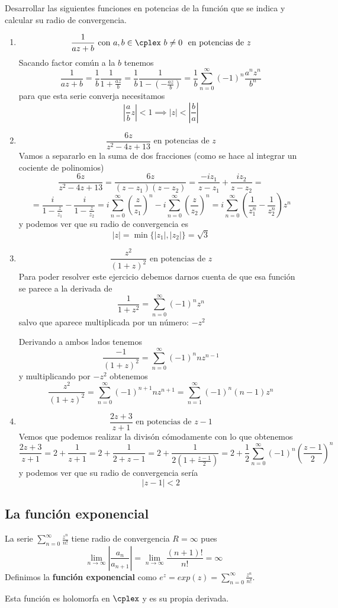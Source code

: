 \documentclass{apuntes}
\begin{document}
\begin{example}
Desarrollar las siguientes funciones en potencias de la función que se indica y calcular su radio de convergencia.
\begin{enumerate}
\item
\[\frac{1}{az+b} \text{ con } a,b \in \cplex \ b \neq 0 \ \text{ en potencias de } z\]
Sacando factor común a la $b$ tenemos
\[\frac{1}{az+b} =  \frac{1}{b} \frac{1}{1+\frac{az}{b}} = \frac{1}{b}\frac{1}{1-\left(-\frac{az}{b}\right)} = \frac{1}{b}\sum_{n=0}^{\infty}(-1)^n\frac{a^nz^n}{b^n}\]
para que esta serie converja necesitamos
\[\left| \frac{a}{b}z\right| < 1 \implies |z| < \left| \frac{b}{a} \right|\]

\item
\[\frac{6z}{z^2-4z+13} \text{ en potencias de } z\]
Vamos a separarlo en la suma de dos fracciones (como se hace al integrar un cociente de polinomios)
\[\frac{6z}{z^2-4z+13} = \frac{6z}{(z-z_1)(z-z_2)} = \frac{-iz_1}{z-z_1} + \frac{iz_2}{z-z_2} = \]
\[= \frac{i}{1-\frac{z}{z_1}} - \frac{i}{1-\frac{z}{z_2}} = i\sum_{n=0}^{\infty}\left(\frac{z}{z_1}\right)^n - i\sum_{n=0}^{\infty}\left(\frac{z}{z_2}\right)^n = i\sum_{n=0}^{\infty}\left( \frac{1}{z_1^n}-\frac{1}{z_2^n}\right)z^n\]
y podemos ver que su radio de convergencia es
\[|z| = \min \{|z_1|, |z_2|\}= \sqrt{3}\]

\item
\[\frac{z^2}{(1+z)^2} \text{ en potencias de } z\]
Para poder resolver este ejercicio debemos darnos cuenta de que esa función se parece a la derivada de
\[\frac{1}{1+z^2} = \sum_{n=0}^{\infty}(-1)^n z^n\]
salvo que aparece multiplicada por un número: $-z^2$

Derivando a ambos lados tenemos
\[\frac{-1}{(1+z)^2}=\sum_{n=0}^{\infty}(-1)^nnz^{n-1}\]
y multiplicando por $-z^2$ obtenemos
\[\frac{z^2}{(1+z)^2} = \sum_{n=0}^{\infty}(-1)^{n+1}nz^{n+1} = \sum_{n=1}^{\infty}(-1)^n(n-1)z^{n}\]

\item
\[\frac{2z+3}{z+1} \text{ en potencias de } z-1\]
Vemos que podemos realizar la divisón cómodamente con lo que obtenemos
\[\frac{2z+3}{z+1}=2+\frac{1}{z+1} = 2 + \frac{1}{2+z-1} = 2 + \frac{1}{2\left( 1+\frac{z-1}{2}\right)} = 2+\frac{1}{2}\sum_{n=0}^{\infty}(-1)^n\left(\frac{z-1}{2} \right)^n\]
y podemos ver que su radio de convergencia sería
\[|z-1| < 2\]

\end{enumerate}
\end{example}

\subsection{La función exponencial}
\begin{defn}
La serie $\sum_{n=0}^{\infty}\frac{z^n}{n!}$ tiene radio de convergencia $R=\infty$ pues
\[\lim_{n \to \infty}\left| \frac{a_n}{a_{n+1}}\right| = \lim_{n \to \infty} \frac{(n+1)!}{n!} = \infty\]
Definimos la \textbf{función exponencial} como $e^z=exp(z)=\sum_{n=0}^{\infty}\frac{z^n}{n!}$.

Esta función es holomorfa en $\cplex$ y es su propia derivada.
\end{defn}
\end{document}
